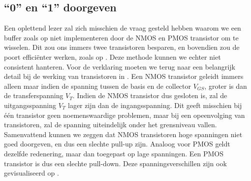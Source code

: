 \subsection{``0'' en ``1'' doorgeven}
Een oplettend lezer zal zich misschien de vraag gesteld hebben waarom we een buffer zoals op  niet implementeren door de NMOS en PMOS transistor om te wisselen. Dit zou ons immers twee transistoren besparen, en bovendien zou de poort effici\"enter werken, zoals op . Deze methode kunnen we echter niet consistent hanteren. Voor de verklaring moeten we terug naar een belangrijk detail bij de werking van transistoren in . Een NMOS transistor geleidt immers alleen maar indien de spanning tussen de basis en de collector $V_{GS}$, groter is dan de transferspanning $V_{T}$. Indien de NMOS transistor dus gesloten is, zal de uitgangsspanning $V_{T}$ lager zijn dan de ingangsspanning. Dit geeft misschien bij \'e\'en transistor geen noemenswaardige problemen, maar bij een opeenvolging van transistoren, zal de spanning uiteindelijk onder het grensniveau vallen. Samenvattend kunnen we zeggen dat NMOS transistoren hoge spanningen niet goed doorgeven, en dus een slechte pull-up zijn. Analoog voor PMOS geldt dezelfde redenering, maar dan toegepast op lage spanningen. Een PMOS transistor is dus een slechte pull-down. Deze spanningsverschillen zijn ook gevisualiseerd op .

